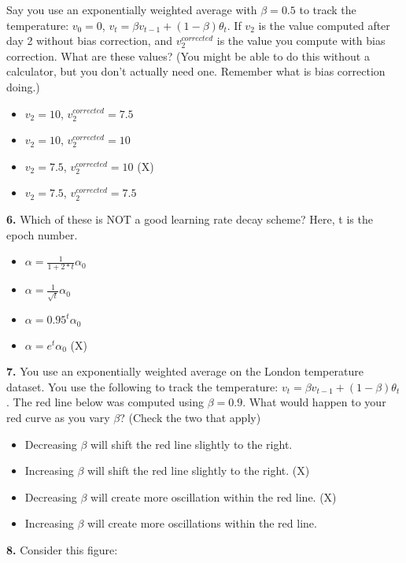Say you use an exponentially weighted average with $\beta = 0.5$ to track the temperature: $v_0 = 0$, $v_t = \beta v_{t-1} +(1-\beta)\theta_t$. If $v_2$ is the value computed after day 2 without bias correction, and $v_2^{corrected}$ is the value you compute with bias correction. What are these values? (You might be able to do this without a calculator, but you don't actually need one. Remember what is bias correction doing.)
\begin{itemize}
    \item $v_2 = 10$, $v_2^{corrected} = 7.5$
    \item $v_2 = 10$, $v_2^{corrected} = 10$
    \item $v_2 = 7.5$, $v_2^{corrected} = 10$ (X)
    \item $v_2 = 7.5$, $v_2^{corrected} = 7.5$
\end{itemize}
\textbf{6.} Which of these is NOT a good learning rate decay scheme? Here, t is the epoch number.
\begin{itemize}
    \item $\alpha = \frac{1}{1+2*t} \alpha_0$
    \item $\alpha = \frac{1}{\sqrt{t}} \alpha_0$
    \item $\alpha = 0.95^t \alpha_0$
    \item $\alpha = e^t \alpha_0$ (X)
\end{itemize}
\textbf{7.} You use an exponentially weighted average on the London temperature dataset. You use the following to track the temperature: $v_{t} = \beta v_{t-1} + (1-\beta)\theta_t$. The red line below was computed using $\beta = 0.9$. What would happen to your red curve as you vary $\beta$? (Check the two that apply)
\begin{itemize}
    \item Decreasing $\beta$ will shift the red line slightly to the right.
    \item Increasing $\beta$ will shift the red line slightly to the right. (X)
    \item Decreasing $\beta$ will create more oscillation within the red line. (X)
    \item Increasing $\beta$ will create more oscillations within the red line.
\end{itemize}
\textbf{8.} Consider this figure:

